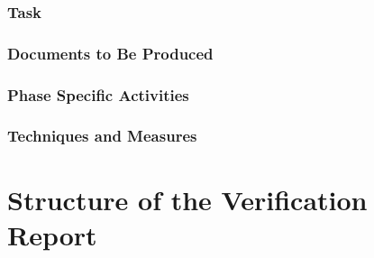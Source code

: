\documentclass{template/openetcs_report}
\begin{document}
\subsubsection{Task}
\label{sec:sfm-verif-task}

\subsubsection{Documents to Be Produced}
\label{sec:sfm-verif-docum-be-prod}

\subsubsection{Phase Specific Activities}
\label{sec:sfm-verif-phase-spec-activ}

\subsubsection{Techniques and Measures}
\label{sec:sfm-verif-techniques-measures}







\section{Structure of the Verification Report}
\label{sec:structure-vv-plan}
\end{document}
